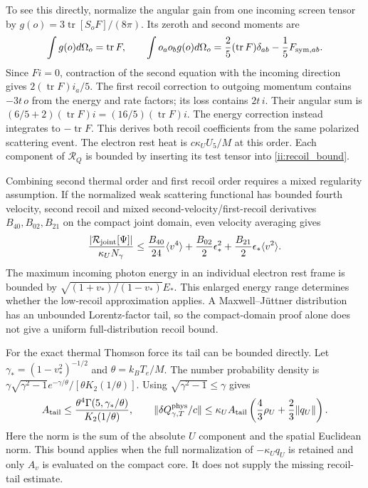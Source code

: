 To see this directly, normalize the angular gain from one incoming screen tensor by
$g(o)=3\operatorname{tr}[S_oF]/(8\pi)$. Its zeroth and second moments are
\begin{equation}
 \int g(o)d\Omega_o=\operatorname{tr}F,\qquad
 \int o_ao_bg(o)d\Omega_o
 =\frac25(\operatorname{tr}F)\delta_{ab}-\frac15F_{{\rm sym},ab}.
 \label{ii:recoil_angular_identity}
\end{equation}
Since $Fi=0$, contraction of the second equation with the incoming direction gives $2(\operatorname{tr}F)i_a/5$. The first recoil correction to outgoing momentum contains $-3t\,o$ from the energy and rate factors; its loss contains $2t\,i$. Their angular sum is $(6/5+2)(\operatorname{tr}F)i=(16/5)(\operatorname{tr}F)i$. The energy correction instead integrates to $-\operatorname{tr}F$. This derives both recoil coefficients from the same polarized scattering event.
 The electron rest heat is $c\kappa_UU_5/M$ at this order. Each component of $\mathcal R_Q$ is bounded by inserting its test tensor into \eqref{ii:recoil_bound}.

Combining second thermal order and first recoil order requires a mixed regularity assumption. If the normalized weak scattering functional has bounded fourth velocity, second recoil and mixed second-velocity/first-recoil derivatives $B_{40},B_{02},B_{21}$ on the compact joint domain, even velocity averaging gives
\begin{equation}
 \frac{|\mathcal R_{\rm joint}[\Psi]|}{\kappa_UN_\gamma}
 \le \frac{B_{40}}{24}\langle v^4\rangle
      +\frac{B_{02}}2\epsilon_*^2
      +\frac{B_{21}}2\epsilon_*\langle v^2\rangle.
 \label{ii:joint_remainder}
\end{equation}
The maximum incoming photon energy in an individual electron rest frame is bounded by
$\sqrt{(1+v_*)/(1-v_*)}E_*$. This enlarged energy range determines whether the low-recoil approximation applies. A Maxwell--J\"uttner distribution has an unbounded Lorentz-factor tail, so the compact-domain proof alone does not give a uniform full-distribution recoil bound.

For the exact thermal Thomson force its tail can be bounded directly. Let $\gamma_*=(1-v_*^2)^{-1/2}$ and $\theta=k_BT_e/M$. The number probability density is
$\gamma\sqrt{\gamma^2-1}e^{-\gamma/\theta}/[\theta K_2(1/\theta)]$.
Using $\sqrt{\gamma^2-1}\le\gamma$ gives
\begin{equation}
 A_{\rm tail}\le
 \frac{\theta^4\Gamma(5,\gamma_*/\theta)}{K_2(1/\theta)},\qquad
 \|\delta Q_{\gamma,T}^{\rm phys}/c\|
 \le\kappa_UA_{\rm tail}
            \left(\frac43\rho_U+\frac23\|q_U\|\right).
 \label{ii:thermal_tail}
\end{equation}
Here the norm is the sum of the absolute $U$ component and the spatial Euclidean norm. This bound applies when the full normalization of $-\kappa_Uq_U$ is retained and only $A_v$ is evaluated on the compact core. It does not supply the missing recoil-tail estimate.

